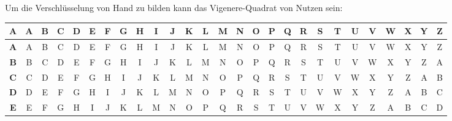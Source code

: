 					Um die Verschlüsselung von Hand zu bilden kann das Vigenere-Quadrat von Nutzen sein:
					\begin{table}[H]
						\centering
						\tiny
						\begin{tabular}{|c||c|c|c|c|c|c|c|c|c|c|c|c|c|c|c|c|c|c|c|c|c|c|c|c|c|c|}
							\hline
							\textbf{A} & \textbf{A} & \textbf{B} & \textbf{C} & \textbf{D} & \textbf{E} & \textbf{F} & \textbf{G} & \textbf{H} & \textbf{I} & \textbf{J} & \textbf{K} & \textbf{L} & \textbf{M} & \textbf{N} & \textbf{O} & \textbf{P} & \textbf{Q} & \textbf{R} & \textbf{S} & \textbf{T} & \textbf{U} & \textbf{V} & \textbf{W} & \textbf{X} & \textbf{Y} & \textbf{Z} \\ \hline \hline
							\textbf{A} & A          & B          & C          & D          & E          & F          & G          & H          & I          & J          & K          & L          & M          & N          & O          & P          & Q          & R          & S          & T          & U          & V          & W          & X          & Y          & Z          \\ \hline
							\textbf{B} & B          & C          & D          & E          & F          & G          & H          & I          & J          & K          & L          & M          & N          & O          & P          & Q          & R          & S          & T          & U          & V          & W          & X          & Y          & Z          & A          \\ \hline
							\textbf{C} & C          & D          & E          & F          & G          & H          & I          & J          & K          & L          & M          & N          & O          & P          & Q          & R          & S          & T          & U          & V          & W          & X          & Y          & Z          & A          & B          \\ \hline
							\textbf{D} & D          & E          & F          & G          & H          & I          & J          & K          & L          & M          & N          & O          & P          & Q          & R          & S          & T          & U          & V          & W          & X          & Y          & Z          & A          & B          & C          \\ \hline
							\textbf{E} & E          & F          & G          & H          & I          & J          & K          & L          & M          & N          & O          & P          & Q          & R          & S          & T          & U          & V          & W          & X          & Y          & Z          & A          & B          & C          & D          \\ \hline

\end{tabular}
\end{table}
